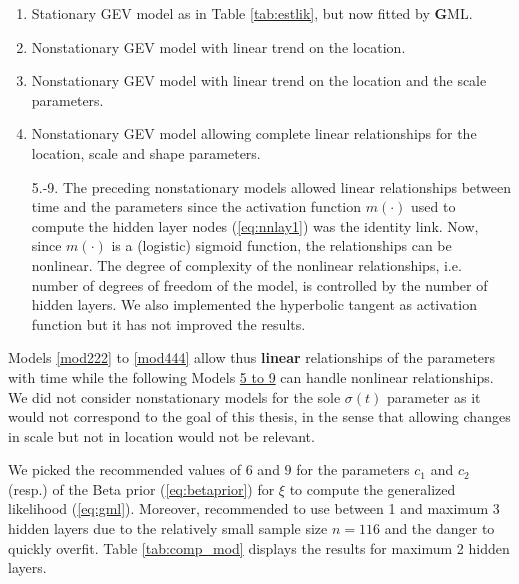 \begin{enumerate}
	\item\label{mod111} Stationary GEV model as in Table \ref{tab:estlik}, but now fitted by \textbf{G}ML.
	
	\item\label{mod222} Nonstationary GEV  model with linear trend on the location. 
	\item Nonstationary GEV model with linear trend on the location and the scale parameters.
	
	\item\label{mod444} Nonstationary GEV model allowing complete linear relationships for the location, scale and shape parameters.
	
	\item[5.-9.]\label{i:nonlin} The preceding nonstationary models allowed linear relationships between time and the parameters since the activation function $m(\cdot)$ used to compute the hidden layer nodes (\ref{eq:nnlay1}) was the identity link. Now, since $m(\cdot)$ is a (logistic) sigmoid function, the relationships can be nonlinear. The degree of complexity of the nonlinear relationships, i.e. number of degrees of freedom of the model, is controlled by the number of hidden layers. We also implemented the hyperbolic tangent as activation function but it has not improved the results.
\end{enumerate}
Models \ref{mod222} to \ref{mod444} allow thus \textbf{linear} relationships of the parameters with time while the following Models \hyperref[i:nonlin]{5 to 9} can handle nonlinear relationships.
We did not consider nonstationary models for the sole $\sigma(t)$ parameter as it would not correspond to the goal of this thesis, in the sense that allowing changes in scale but not in location would not be relevant. 

We picked the recommended values of $6$ and $9$ for the parameters $c_1$ and $c_2$ (resp.) of the Beta prior (\ref{eq:betaprior}) for $\xi$ to compute the generalized likelihood (\ref{eq:gml}). Moreover, 
\citet{cannon_flexible_2010} recommended to use between 1 and maximum 3 hidden layers due to the relatively small sample size $n=116$ and the danger to quickly overfit. Table \ref{tab:comp_mod} displays the results for maximum 2 hidden layers.


